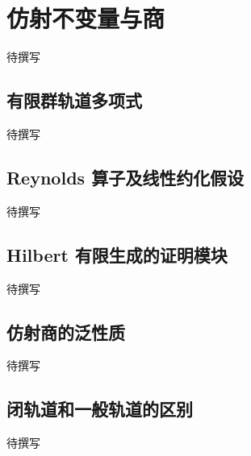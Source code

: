 
% 
% 

\section{仿射不变量与商}
\label{g5:sec:3401}

待撰写

\subsection{有限群轨道多项式}
\label{g5:subsec:3401:01}
待撰写

\subsection{Reynolds 算子及线性约化假设}
\label{g5:subsec:3401:02}
待撰写

\subsection{Hilbert 有限生成的证明模块}
\label{g5:subsec:3401:03}
待撰写

\subsection{仿射商的泛性质}
\label{g5:subsec:3401:04}
待撰写

\subsection{闭轨道和一般轨道的区别}
\label{g5:subsec:3401:05}
待撰写
